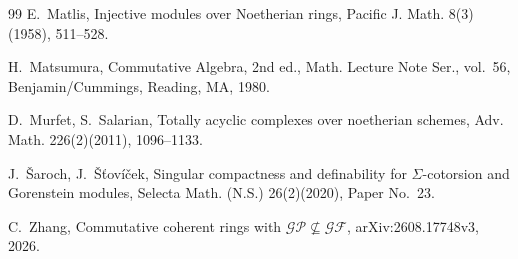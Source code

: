 \documentclass[11pt]{amsart}
\theoremstyle{remark}
\begin{document}
\begin{thebibliography}{99}
E.~Matlis,
Injective modules over Noetherian rings,
Pacific J. Math. 8(3)(1958), 511--528.

H.~Matsumura,
Commutative Algebra,
2nd ed., Math. Lecture Note Ser., vol.~56,
Benjamin/Cummings, Reading, MA, 1980.

D.~Murfet, S.~Salarian,
Totally acyclic complexes over noetherian schemes,
Adv. Math. 226(2)(2011), 1096--1133.


J.~\v{S}aroch, J.~\v{S}\v{t}ov\'{i}\v{c}ek,
Singular compactness and definability for $\Sigma$-cotorsion and Gorenstein modules,
Selecta Math. (N.S.) 26(2)(2020), Paper No.~23.

C.~Zhang,
Commutative coherent rings with $\mathcal{GP}\not\subseteq\mathcal{GF}$, arXiv:2608.17748v3, 2026.

\end{thebibliography}
\end{document}

